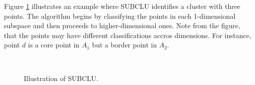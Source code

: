 Figure \ref{fig:subclu} illustrates an example where SUBCLU identifies a cluster with three points. The algorithm begins by classifying the points in each 1-dimensional subspace and then proceeds to higher-dimensional ones. Note from the figure, that the points may have different classifications accros dimensions. For instance, point $d$ is a core point in $A_1$ but a border point in $A_2$.
\begin{figure}[H]
    \vspace*{-0.6cm}
    \centering
    ~~~~
    ~
    \caption{Illustration of SUBCLU.}
    \label{fig:subclu}
    \vspace*{-0.4cm}
\end{figure}